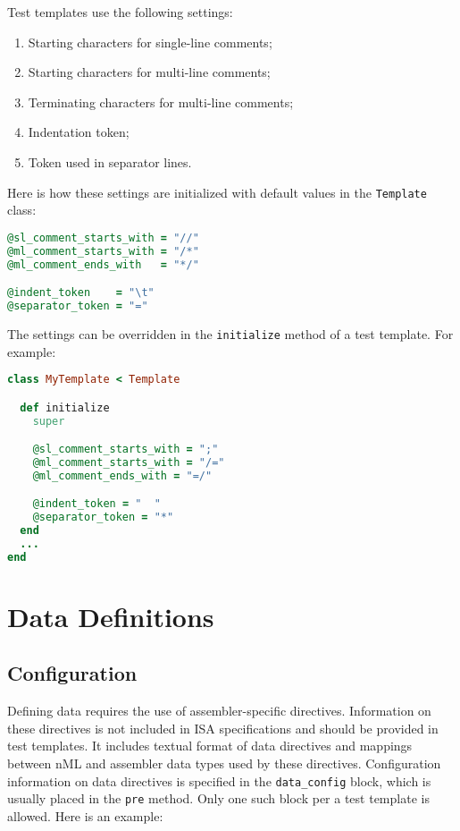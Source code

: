 \documentclass[oneside,final,12pt]{extreport}
\begin{document}
Test templates use the following settings:

\begin{enumerate}
  \item Starting characters for single-line comments;
  \item Starting characters for multi-line comments;
  \item Terminating characters for multi-line comments;
  \item Indentation token;
  \item Token used in separator lines.
\end{enumerate}

Here is how these settings are initialized with default values in
the \texttt{Template} class:

\begin{lstlisting}[language=ruby]
@sl_comment_starts_with = "//"
@ml_comment_starts_with = "/*"
@ml_comment_ends_with   = "*/"

@indent_token    = "\t"
@separator_token = "="
\end{lstlisting}

The settings can be overridden in the \texttt{initialize} method of a test template.
For example:

\begin{lstlisting}[language=ruby]
class MyTemplate < Template

  def initialize
    super

    @sl_comment_starts_with = ";" 
    @ml_comment_starts_with = "/="
    @ml_comment_ends_with = "=/"

    @indent_token = "  "
    @separator_token = "*" 
  end
  ...
end
\end{lstlisting}


\section{Data Definitions}

\subsection{Configuration}

Defining data requires the use of assembler-specific directives. Information on
these directives is not included in ISA specifications and should be provided in test
templates. It includes textual format of data directives and mappings between nML and
assembler data types used by these directives. Configuration information on data
directives is specified in the \texttt{data{\_}config} block, which is usually placed
in the \texttt{pre} method. Only one such block per a test template is allowed.
Here is an example:
\end{document}
